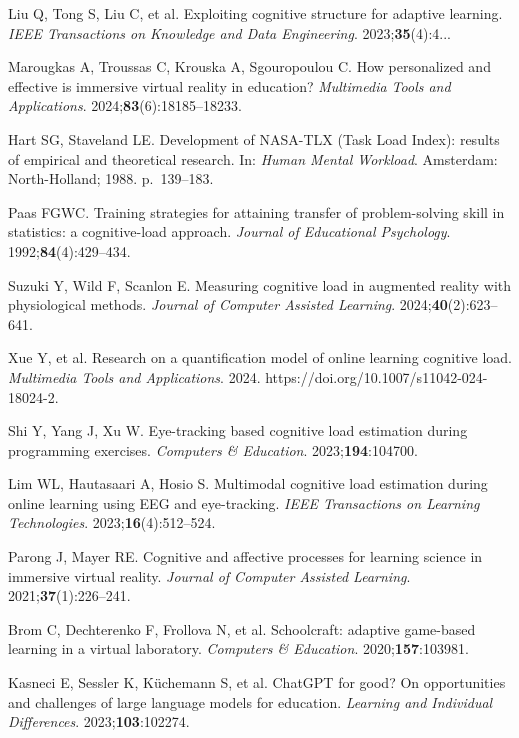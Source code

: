\documentclass[ASNA,twocolumn]{USG} %
\begin{document}
\begin{thebibliography}{}
Liu Q, Tong S, Liu C, et al.
Exploiting cognitive structure for adaptive learning.
\textit{IEEE Transactions on Knowledge and Data Engineering}.
2023;\textbf{35}(4):4...

Marougkas A, Troussas C, Krouska A, Sgouropoulou C.
How personalized and effective is immersive virtual reality in education?
\textit{Multimedia Tools and Applications}.
2024;\textbf{83}(6):18185--18233.

Hart SG, Staveland LE.
Development of NASA-TLX (Task Load Index): results of empirical and
theoretical research.
In: \textit{Human Mental Workload}. Amsterdam: North-Holland; 1988.
p.~139--183.

Paas FGWC.
Training strategies for attaining transfer of problem-solving skill in
statistics: a cognitive-load approach.
\textit{Journal of Educational Psychology}.
1992;\textbf{84}(4):429--434.

Suzuki Y, Wild F, Scanlon E.
Measuring cognitive load in augmented reality with physiological methods.
\textit{Journal of Computer Assisted Learning}.
2024;\textbf{40}(2):623--641.

Xue Y, et al.
Research on a quantification model of online learning cognitive load.
\textit{Multimedia Tools and Applications}.
2024. https://doi.org/10.1007/s11042-024-18024-2.

Shi Y, Yang J, Xu W.
Eye-tracking based cognitive load estimation during
programming exercises.
\textit{Computers \& Education}.
2023;\textbf{194}:104700.

Lim WL, Hautasaari A, Hosio S.
Multimodal cognitive load estimation during
online learning using EEG and eye-tracking.
\textit{IEEE Transactions on Learning Technologies}.
2023;\textbf{16}(4):512--524.

Parong J, Mayer RE.
Cognitive and affective processes for learning science
in immersive virtual reality.
\textit{Journal of Computer Assisted Learning}.
2021;\textbf{37}(1):226--241.

Brom C, Dechterenko F, Frollova N, et al.
Schoolcraft: adaptive game-based learning in a
virtual laboratory.
\textit{Computers \& Education}.
2020;\textbf{157}:103981.

Kasneci E, Sessler K, Küchemann S, et al.
ChatGPT for good? On opportunities and challenges of
large language models for education.
\textit{Learning and Individual Differences}.
2023;\textbf{103}:102274.


\end{thebibliography}
\end{document}
